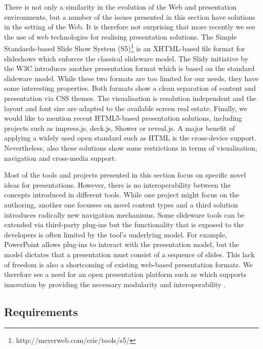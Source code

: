 \documentclass[a4paper,12pt]{report}
\begin{document}
    There is not only a similarity in the evolution of the Web and presentation
    environments, but a number of the issues presented in this section have
    solutions in the setting of the Web. It is therefore not surprising that
    more recently we see the use of web technologies for realising presentation
    solutions. The Simple Standards-based Slide Show System
    (S5)\footnote{http://meyerweb.com/eric/tools/s5/} is an XHTML-based file
    format for slideshows which enforces the classical slideware model. The
    Slidy \citep{raggett-1} initiative by the W3C introduces another
    presentation format which is based on the standard slideware model. While
    these two formats are too limited for our needs, they have some interesting
    properties. Both formats show a clean separation of content and
    presentation via CSS themes. The visualisation is resolution independent
    and the layout and font size are adapted to the available screen real
    estate. Finally, we would like to mention recent HTML5-based presentation
    solutions, including projects such as impress.js, deck.js, Shower or
    reveal.js. A major benefit of applying a widely used open standard such as
    HTML is the cross-device support. Nevertheless, also these solutions show
    some restrictions in terms of visualisation, navigation and cross-media
    support.

    Most of the tools and projects presented in this section focus on specific
    novel ideas for presentations. However, there is no interoperability
    between the concepts introduced in different tools. While one project might
    focus on the authoring, another one focusses on novel content types and a
    third solution introduces radically new navigation mechanisms. Some
    slideware tools can be extended via third-party plug-ins but the
    functionality that is exposed to the developers is often limited by the
    tool's underlying model. For example, PowerPoint allows plug-ins to
    interact with the presentation model, but the model dictates that a
    presentation must consist of a sequence of slides. This lack of freedom is
    also a shortcoming of existing web-based presentation formats. We therefore
    see a need for an open presentation platform such as \mxp which supports
    innovation by providing the necessary modularity and interoperability
    \citep{bush-1}.

   \subsection{Requirements}
\end{document}
